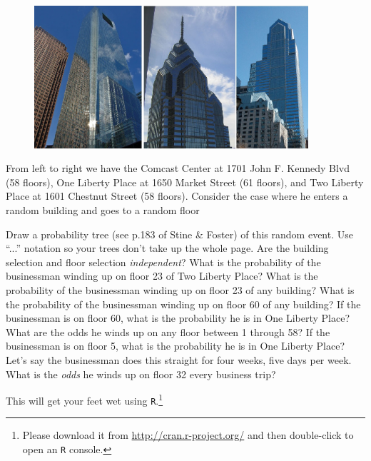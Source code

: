 \documentclass[12pt]{article}
\begin{document}
\begin{figure}[htp]
\centering
\includegraphics[width=4in, height=2.08in]{buildings.jpg}
\end{figure}
\FloatBarrier

\noindent From left to right we have the Comcast Center at 1701 John F. Kennedy Blvd (58 floors), One Liberty Place at 1650 Market Street (61 floors), and Two Liberty Place at 1601 Chestnut Street (58 floors). Consider the case where he enters a random building and goes to a random floor

\begin{enumerate}
\easysubproblem Draw a probability tree (see p.183 of Stine \& Foster) of this random event. Use ``...'' notation so your trees don't take up the whole page.
\easysubproblem Are the building selection and floor selection \textit{independent}?
\easysubproblem What is the probability of the businessman winding up on floor 23 of Two Liberty Place?
\easysubproblem What is the probability of the businessman winding up on floor 23 of any building?
\easysubproblem What is the probability of the businessman winding up on floor 60 of any building?
\easysubproblem If the businessman is on floor 60, what is the probability he is in One Liberty Place?
\easysubproblem What are the odds he winds up on any floor between 1 through 58?
\intermediatesubproblem If the businessman is on floor 5, what is the probability he is in One Liberty Place?
\intermediatesubproblem Let's say the businessman does this straight for four weeks, five days per week. What is the \textit{odds} he winds up on floor 32 every business trip?
\end{enumerate}

\problem This will get your feet wet using \texttt{R}.\footnote{Please download it from \url{http://cran.r-project.org/} and then double-click to open an \texttt{R} console.}
\end{document}
